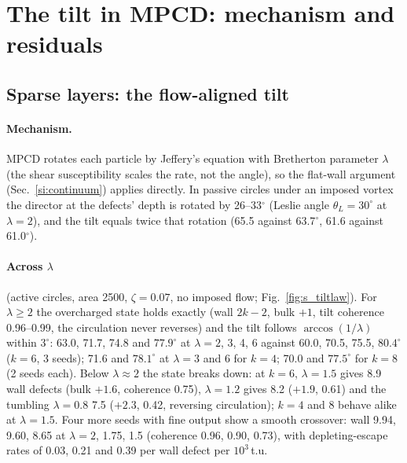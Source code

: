 \documentclass[aps,prl,onecolumn,superscriptaddress,amsmath,amssymb,nofootinbib]{revtex4-2}
\begin{document}
\section{The tilt in MPCD: mechanism and residuals}\label{si:tilt}
\subsection{Sparse layers: the flow-aligned tilt}
\paragraph{Mechanism.} MPCD rotates each particle by Jeffery's equation with Bretherton parameter $\lambda$ (the shear susceptibility scales the rate, not the angle), so the
flat-wall argument (Sec.~\ref{si:continuum}) applies directly. In passive circles under an imposed vortex the director at the defects' depth is rotated by 26--33$^\circ$
(Leslie angle $\theta_L=30^\circ$ at $\lambda=2$), and the tilt equals twice that rotation (65.5 against 63.7$^\circ$, 61.6 against 61.0$^\circ$).

\paragraph{Across $\lambda$} (active circles, area 2500, $\zeta=0.07$, no imposed flow; Fig.~\ref{fig:s_tiltlaw}). For $\lambda\geq2$ the overcharged state holds exactly
(wall $2k-2$, bulk $+1$, tilt coherence 0.96--0.99, the circulation never reverses) and the tilt follows $\arccos(1/\lambda)$ within $3^\circ$: 63.0, 71.7, 74.8 and $77.9^\circ$ at
$\lambda=2$, 3, 4, 6 against 60.0, 70.5, 75.5, $80.4^\circ$ ($k=6$, 3 seeds); 71.6 and $78.1^\circ$ at $\lambda=3$ and 6 for $k=4$; 70.0 and $77.5^\circ$ for $k=8$ (2 seeds each).
Below $\lambda\approx2$ the state breaks down: at $k=6$, $\lambda=1.5$ gives 8.9 wall defects (bulk $+1.6$, coherence 0.75), $\lambda=1.2$ gives 8.2 ($+1.9$, 0.61) and the tumbling
$\lambda=0.8$ 7.5 ($+2.3$, 0.42, reversing circulation); $k=4$ and 8 behave alike at $\lambda=1.5$. Four more seeds with fine output show a smooth crossover: wall 9.94, 9.60, 8.65 at
$\lambda=2$, 1.75, 1.5 (coherence 0.96, 0.90, 0.73), with depleting-escape rates of 0.03, 0.21 and 0.39 per wall defect per $10^3$\,t.u.
\end{document}
